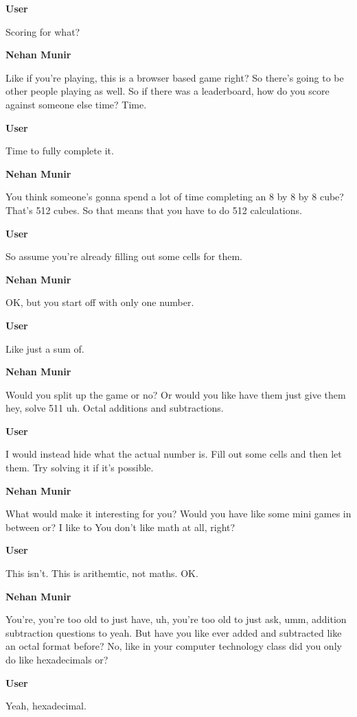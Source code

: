 \documentclass{article}
\begin{document}
\noindent \textbf{User}

Scoring for what?

\noindent \textbf{Nehan Munir}

Like if you're playing, this is a browser based game right? So there's going to be other people playing as well. So if there was a leaderboard, how do you score against someone else time? Time.

\noindent \textbf{User}

Time to fully complete it.

\noindent \textbf{Nehan Munir}

You think someone's gonna spend a lot of time completing an 8 by 8 by 8 cube? That's 512 cubes. So that means that you have to do 512 calculations.

\noindent \textbf{User}

So assume you're already filling out some cells for them.

\noindent \textbf{Nehan Munir}

OK, but you start off with only one number.

\noindent \textbf{User}

Like just a sum of.

\noindent \textbf{Nehan Munir}

Would you split up the game or no? Or would you like have them just give them hey, solve 511 uh. Octal additions and subtractions.

\noindent \textbf{User}

I would instead hide what the actual number is. Fill out some cells and then let them. Try solving it if it's possible.

\noindent \textbf{Nehan Munir}

What would make it interesting for you? Would you have like some mini games in between or? I like to You don't like math at all, right?

\noindent \textbf{User}

This isn't. This is arithemtic, not maths. OK.

\noindent \textbf{Nehan Munir}

You're, you're too old to just have, uh, you're too old to just ask, umm, addition subtraction questions to yeah. But have you like ever added and subtracted like an octal format before? No, like in your computer technology class did you only do like hexadecimals or?

\noindent \textbf{User}

Yeah, hexadecimal.
\end{document}
